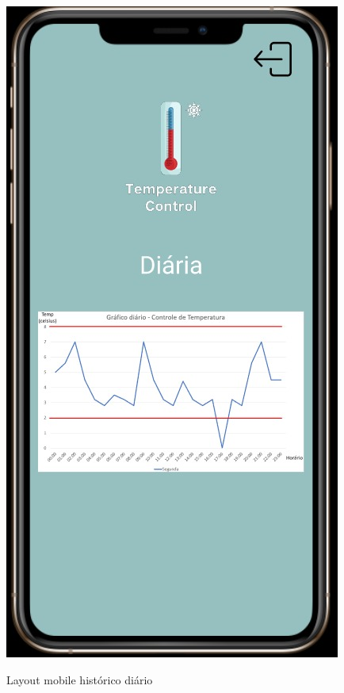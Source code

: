     \begin{figure}[ht]
        \caption{Layout mobile histórico diário}
        \centering
        \includegraphics[scale=0.5]{img/mobile/temp_diaria.jpeg}
        \label{fig:mobileTempDiaria}
    \end{figure}

